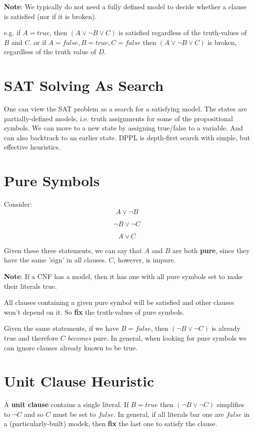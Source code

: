 \documentclass[11pt]{article}
\begin{document}
\textbf{Note}: We typically do not need a fully defined model to decide whether a clause is satisfied (nor if it is broken).

e.g. if \(A = true\), then \((A \lor \neg B \lor C)\) is satisfied regardless of the truth-values of \(B\) and \(C\).
or if \(A = false, B = true, C = false\) then \((A \lor \neg B \lor C)\) is broken, regardless of the truth value of \(D\).

\section{SAT Solving As Search}
\label{sec:org17630c7}
One can view the SAT problem as a search for a satisfying model.
The states are partially-defined models, i.e. truth assignments for some of the propositional symbols.
We can move to a new state by assigning true/false to a variable.
And can also backtrack to an earlier state.
DPPL is depth-first search with simple, but effective heuristics.


\section{Pure Symbols}
\label{sec:org25af95f}
Consider:
\begin{equation}
A \lor \neg B
\end{equation}

\begin{equation}
\neg B \lor \neg C
\end{equation}

\begin{equation}
A \lor C
\end{equation}

Given these three statements, we can say that \(A\) and \(B\) are both \textbf{pure}, since they have the same 'sign' in all clauses.
\(C\), however, is impure.

\textbf{Note}: If a CNF has a model, then it has one with all pure symbols set to make their literals true.

All clauses containing a given pure symbol will be satisfied and other clauses won't depend on it.
So \textbf{fix} the truth-values of pure symbols.

Given the same statements, if we have \(B = false\), then \((\neg B \lor \neg C)\) is already true and therefore \(C\) \emph{becomes} pure.
In general, when looking for pure symbols we can ignore clauses already known to be true.

\section{Unit Clause Heuristic}
\label{sec:org431c5ce}
A \textbf{unit clause} contains a single literal.
If \(B = true\) then \((\neg B \lor \neg C)\) simplifies to \(\neg C\) and so \(C\) must be set to \(false\).
In general, if all literals bar one are \(false\) in a (particularly-built) modek, then \textbf{fix} the last one to satisfy the clause.
\end{document}

